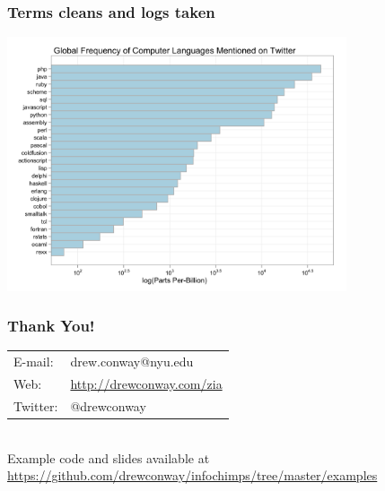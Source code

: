 \documentclass[xcolor=dvipsnames, 9pt,handout]{beamer}
\begin{document}
\begin{frame}[fragile]
    \frametitle{Terms cleans and logs taken}
    \includegraphics[width=10cm]{images/lang_pop3.png}
\end{frame}


\begin{frame}[fragile]
    \frametitle{Thank You!}
    \begin{tabular}{ll}
        E-mail: & drew.conway@nyu.edu \\
        Web:    & \url{http://drewconway.com/zia} \\
        Twitter:& @drewconway
    \end{tabular}
    \vspace{2cm} \\
    Example code and slides available at \url{https://github.com/drewconway/infochimps/tree/master/examples}
\end{frame}
\end{document}
